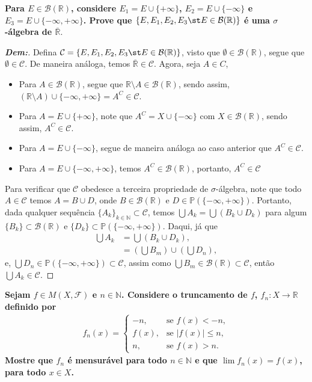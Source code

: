 \newpage
{}
\bigline 
\textbf{Para $E \in \mathcal B(\mathbb R)$, considere $E_1 = E \cup \{+\infty\}$, 
$E_2 = E \cup \{-\infty\}$ e $E_3 = E \cup \{-\infty, +\infty\}$. Prove que 
$\{E, E_1, E_2, E_3\st  E\in \mathcal B(\mathbb R)\}$ 
é uma $\sigma$-álgebra de $\overline{\mathbb R}$}. 
\begin{proof}[\textbf{Dem:}] Defina $\mathcal C = \{E, E_1, E_2, E_3\st  E
\in \mathcal B(\mathbb R)\}$,
visto que $\emptyset\in \mathcal B(\mathbb R)$, segue que $\emptyset \in \mathcal C$.
De maneira análoga, temos $\overline{\mathbb R} \in \mathcal C$. Agora, seja $A \in C$, 
\begin{itemize}
  \item Para  $A \in \mathcal B(\mathbb R)$, 
    segue que $\mathbb R\setminus A \in \mathcal B(\mathbb R)$, sendo assim,
    $\left(\mathbb R \setminus A \right)\cup \{-\infty, +\infty\} = A^C \in \mathcal C$.

  \item Para $A = E \cup \{+ \infty\}$,
    note que $A^C = X \cup \{- \infty\}$ com 
    $X \in \mathcal B (\mathbb R)$, sendo assim, $A^C \in \mathcal C$. 
  \item Para $A = E \cup \{- \infty\}$,
    segue de maneira análoga ao 
    caso anterior que $A^C \in \mathcal C$. 
  \item Para $A = E \cup \{- \infty, + \infty\}$, temos $A^C \in \mathcal B(\mathbb R)$, 
    portanto, $A^C \in \mathcal C$
\end{itemize}
Para verificar que $\mathcal C$ obedesce a terceira propriedade de $\sigma$-álgebra,
note que todo $A \in \mathcal C$ 
temos $A = B \cup D$, onde $B \in \mathcal B (\mathbb R)$ e 
$D \in \mathbb P (\{-\infty, +\infty\}) $. Portanto, dada qualquer 
sequência $\{A_k\}_{k \in \mathbb N}
\subset \mathcal C$, temos $\bigcup A_k = \bigcup \left(B_k \cup D_k\right)$ para algum 
$\{B_k\} \subset \mathcal B (\mathbb R)$ e 
  $\{D_k\}\subset \mathbb P (\{-\infty, +\infty\})$. Daqui, já que 
\begin{align*}
  \bigcup A_k &= \bigcup \left(B_k \cup D_k\right),\\
  &= \left(\bigcup B_m\right) \cup \left(\bigcup D_n\right), 
\end{align*}
e, $\bigcup D_n \in \mathbb P (\{-\infty, +\infty\}) \subset \mathcal C$, assim como 
  $\bigcup B_m \in \mathcal B(\mathbb R) \subset \mathcal C$, então 
  $\bigcup A_k \in \mathcal C$.
\end{proof}
\biglinend
\newpage
{}
\bigline 
\textbf{Sejam $f \in M(X, \mathcal F)$ e $n \in \mathbb N$. Considere o truncamento de $f$, 
$f_n: X \rightarrow \mathbb R$ definido por
\begin{align*}
  f_n(x) =\begin{cases}
    -n, &\text{se } f(x) < -n,\\
    f(x), &\text{se } |f(x)| \le n,\\
    n, &\text{se } f(x)>n.
  \end{cases}
\end{align*}
Mostre que $f_n$ é mensurável para todo $n \in \mathbb N$ e que $\lim f_n(x) = f(x)$, 
para todo $x \in X$.}
